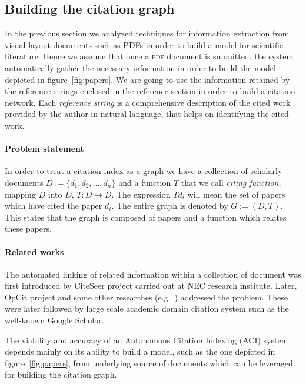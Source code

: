 \subsection{\label{subsec:cit_graph}Building the citation graph}
In the previous section we analyzed techniques for information extraction from visual layout documents such as PDFs in order to build a model for scientific literature. Hence we assume that once a \textsc{pdf} document is submitted, the system automatically gather the necessary information in order to build the model depicted in figure~\ref{fig:papers}. We are going to use the information retained by the reference strings enclosed in the reference section in order to build a citation network. Each \emph{reference string} is a comprehensive description of the cited work provided by the author in natural language, that helps on identifying the cited work.

\paragraph{Problem statement} In order to treat a citation index as a graph \cite{garner1967} we have a collection of scholarly documents $D:=\{d_1, d_2, \ldots, d_n\}$ and a function $T$ that we call \emph{citing function}, mapping $D$ into $D$, $T:D \mapsto D$. The expression $Td_i$ will mean the set of papers which have cited the paper $d_i$. The entire graph is denoted by $G:=(D,T)$. This states that the graph is composed of papers and a function which relates these papers.

\paragraph{Related works} The automated linking of related information within a collection of document was first introduced by CiteSeer project \cite{bollacker1998caw, giles1998cac, lawrence1999dla, lawrence1999iar} carried out at NEC research institute. Later, OpCit project \cite{bergmark2000aer, bergmark2001sad} and some other researches (e.g.\ \cite{claivaz2001fds}) addressed the problem. These were later followed by large scale academic domain citation system such as the well-known Google Scholar.

The viability and accuracy of an Autonomous Citation Indexing (ACI) system depends mainly on its ability to build a model, such as the one depicted in figure~\ref{fig:papers}, from underlying source of documents which can be leveraged for building the citation graph.

